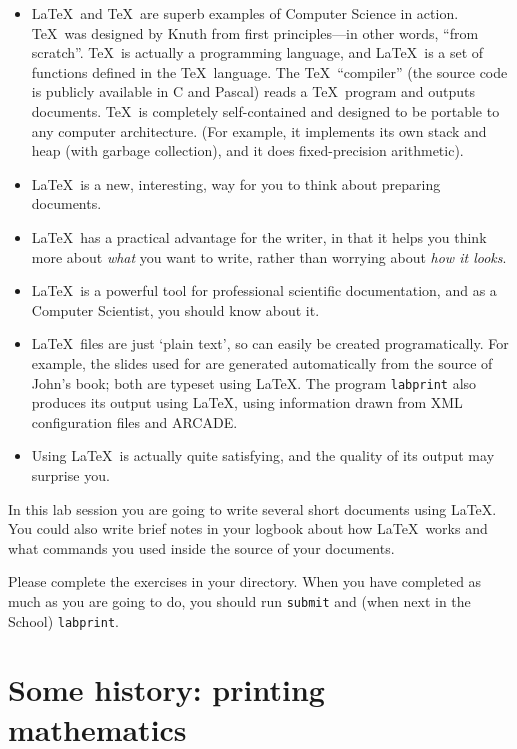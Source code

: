 \begin{refsection}
\begin{itemize}
\item \LaTeX\ and \TeX\ are superb examples of Computer Science in action. \TeX\ was designed by Knuth from first principles---in other words, ``from scratch''.  \TeX\ is actually a programming language, and \LaTeX\ is a set of functions defined in the \TeX\ language. The \TeX\ ``compiler''  (the source code is publicly available in C and Pascal)  reads a \TeX\ program and outputs documents. \TeX\ is completely self-contained and designed to be portable to any computer architecture. (For example, it implements its own stack and heap (with garbage collection), and it does fixed-precision arithmetic). 
\item \LaTeX\ is a new, interesting, way for you to think about preparing documents. 
\item \LaTeX\ has a practical advantage for the writer, in that it helps you think more about \emph{what} you want to write, rather than worrying about \emph{how it looks}.
\item \LaTeX\ is a powerful tool for professional scientific documentation, and as a Computer Scientist, you should know about it.
\item \LaTeX\ files are just `plain text', so can easily be created programatically. For example,  the slides used for  are generated automatically from the source of John's book; both are typeset using \LaTeX. The program \texttt{labprint} also produces its output using \LaTeX, using information drawn from XML configuration files and ARCADE.
  
\item Using \LaTeX\ is actually quite satisfying, and the quality of its output may surprise you.
\end{itemize}

In this lab session you are going to write several short  documents using \LaTeX. You could also write brief notes in your logbook about how \LaTeX\ works and what commands you used inside the source of your documents.

Please complete the exercises in your  directory. When you have completed as much as you are going to do, you should run \texttt{submit} and (when next in the School) \texttt{labprint}.

\section{Some history: printing mathematics}


\end{refsection}
